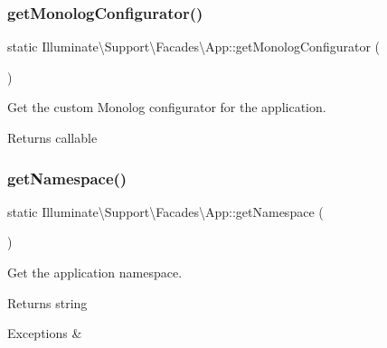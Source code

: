 \subsubsection{\texorpdfstring{get\+Monolog\+Configurator()}{getMonologConfigurator()}}
{\footnotesize\ttfamily static Illuminate\textbackslash{}\+Support\textbackslash{}\+Facades\textbackslash{}\+App\+::get\+Monolog\+Configurator (\begin{DoxyParamCaption}{ }\end{DoxyParamCaption})\hspace{0.3cm}{\ttfamily [static]}}

Get the custom Monolog configurator for the application.

\begin{DoxyReturn}{Returns}
callable 
\end{DoxyReturn}
\mbox{\label{class_illuminate_1_1_support_1_1_facades_1_1_app_ab9efc7221fd51924278d9a959348a556}} 
\subsubsection{\texorpdfstring{get\+Namespace()}{getNamespace()}}
{\footnotesize\ttfamily static Illuminate\textbackslash{}\+Support\textbackslash{}\+Facades\textbackslash{}\+App\+::get\+Namespace (\begin{DoxyParamCaption}{ }\end{DoxyParamCaption})\hspace{0.3cm}{\ttfamily [static]}}

Get the application namespace.

\begin{DoxyReturn}{Returns}
string 
\end{DoxyReturn}

\begin{DoxyExceptions}{Exceptions}
{\em } & \\
\hline
\end{DoxyExceptions}
\mbox{\label{class_illuminate_1_1_support_1_1_facades_1_1_app_ab2b9e7c49809a4eb07a43851556bb5c9}} 
